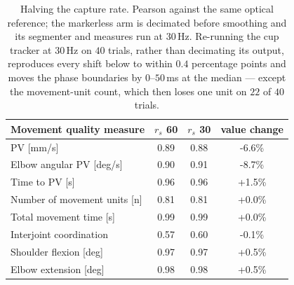 \begin{table}[t]
\caption{Halving the capture rate. Pearson against the same optical reference; the
markerless arm is decimated before smoothing and its segmenter and measures run at $30$\,Hz.
Re-running the cup tracker at $30$\,Hz on $40$ trials, rather than decimating its output,
reproduces every shift below to within $0.4$ percentage points and moves the phase boundaries
by $0$--$50$\,ms at the median --- except the movement-unit count, which then loses one unit
on $22$ of $40$ trials.}
\label{tab:fps}
\centering
\footnotesize
\setlength{\tabcolsep}{4pt}
\begin{tabular}{lccc}
\toprule
Movement quality measure & $r_s$ 60 & $r_s$ 30 & value change \\
\midrule
PV [mm/s] & 0.89 & 0.88 & -6.6\% \\
Elbow angular PV [deg/s] & 0.90 & 0.91 & -8.7\% \\
Time to PV [s] & 0.96 & 0.96 & +1.5\% \\
Number of movement units [n] & 0.81 & 0.81 & +0.0\% \\
Total movement time [s] & 0.99 & 0.99 & +0.0\% \\
Interjoint coordination & 0.57 & 0.60 & -0.1\% \\
Shoulder flexion [deg] & 0.97 & 0.97 & +0.5\% \\
Elbow extension [deg] & 0.98 & 0.98 & +0.5\% \\
\bottomrule
\end{tabular}
\end{table}
